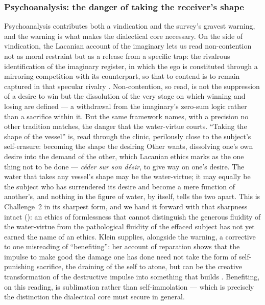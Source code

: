 \subsubsection{Psychoanalysis: the danger of taking the receiver's shape}
\label{p20:ssub:review-psych}

Psychoanalysis contributes both a vindication and the survey's gravest warning, and the warning is what makes the dialectical core necessary. On the side of vindication, the Lacanian account of the imaginary lets us read non-contention not as moral restraint but as a release from a specific trap: the rivalrous identification of the imaginary register, in which the ego is constituted through a mirroring competition with its counterpart, so that to contend is to remain captured in that specular rivalry \parencite{lacan2006}. Non-contention, so read, is not the suppression of a desire to win but the dissolution of the very stage on which winning and losing are defined --- a withdrawal from the imaginary's zero-sum logic rather than a sacrifice within it. But the same framework names, with a precision no other tradition matches, the danger that the water-virtue courts. ``Taking the shape of the vessel'' is, read through the clinic, perilously close to the subject's self-erasure: becoming the shape the desiring Other wants, dissolving one's own desire into the demand of the other, which Lacanian ethics marks as the one thing not to be done --- \emph{céder sur son désir}, to give way on one's desire. The water that takes any vessel's shape may be the water-virtue; it may equally be the subject who has surrendered its desire and become a mere function of another's, and nothing in the figure of water, by itself, tells the two apart. This is Challenge~2 in its sharpest form, and we hand it forward with that sharpness intact (): an ethics of formlessness that cannot distinguish the generous fluidity of the water-virtue from the pathological fluidity of the effaced subject has not yet earned the name of an ethics. Klein supplies, alongside the warning, a corrective to one misreading of ``benefiting'': her account of reparation shows that the impulse to make good the damage one has done need not take the form of self-punishing sacrifice, the draining of the self to atone, but can be the creative transformation of the destructive impulse into something that builds \parencite{klein1937}. Benefiting, on this reading, is sublimation rather than self-immolation --- which is precisely the distinction the dialectical core must secure in general.

